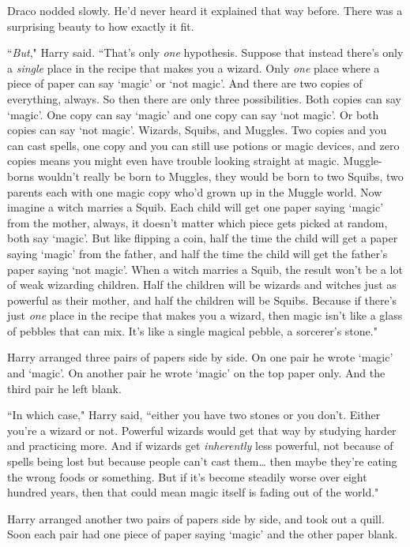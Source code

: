 Draco nodded slowly. He'd never heard it explained that way before. There was a surprising beauty to how exactly it fit.

``\emph{But}," Harry said. ``That's only \emph{one} hypothesis. Suppose that instead there's only a \emph{single} place in the recipe that makes you a wizard. Only \emph{one} place where a piece of paper can say `magic' or `not magic'. And there are two copies of everything, always. So then there are only three possibilities. Both copies can say `magic'. One copy can say `magic' and one copy can say `not magic'. Or both copies can say `not magic'. Wizards, Squibs, and Muggles. Two copies and you can cast spells, one copy and you can still use potions or magic devices, and zero copies means you might even have trouble looking straight at magic. Muggle-borns wouldn't really be born to Muggles, they would be born to two Squibs, two parents each with one magic copy who'd grown up in the Muggle world. Now imagine a witch marries a Squib. Each child will get one paper saying `magic' from the mother, always, it doesn't matter which piece gets picked at random, both say `magic'. But like flipping a coin, half the time the child will get a paper saying `magic' from the father, and half the time the child will get the father's paper saying `not magic'. When a witch marries a Squib, the result won't be a lot of weak wizarding children. Half the children will be wizards and witches just as powerful as their mother, and half the children will be Squibs. Because if there's just \emph{one} place in the recipe that makes you a wizard, then magic isn't like a glass of pebbles that can mix. It's like a single magical pebble, a sorcerer's stone."

Harry arranged three pairs of papers side by side. On one pair he wrote `magic' and `magic'. On another pair he wrote `magic' on the top paper only. And the third pair he left blank.

``In which case," Harry said, ``either you have two stones or you don't. Either you're a wizard or not. Powerful wizards would get that way by studying harder and practicing more. And if wizards get \emph{inherently} less powerful, not because of spells being lost but because people can't cast them{\ldots} then maybe they're eating the wrong foods or something. But if it's become steadily worse over eight hundred years, then that could mean magic itself is fading out of the world."

Harry arranged another two pairs of papers side by side, and took out a quill. Soon each pair had one piece of paper saying `magic' and the other paper blank.


